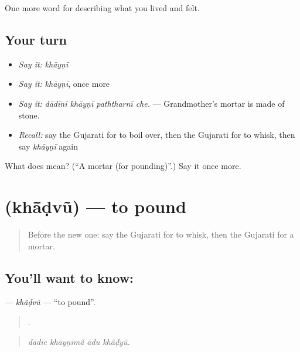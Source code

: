 \begin{grammarlens}[title={What you've built}]
One more word for describing what you lived and felt.
\end{grammarlens}

\subsection*{Your turn}
\begin{itemize}
\raggedright
  \item \emph{Say it:} \emph{khāyṇī}
  \item \emph{Say it:} \emph{khāyṇī}, once more
  \item \emph{Say it:} \emph{dādīnī khāyṇī paththarnī che.} — Grandmother's mortar is made of stone.
  \item \emph{Recall:} say the Gujarati for to boil over, then the Gujarati for to whisk, then say \emph{khāyṇī} again
\end{itemize}

\begin{tcolorbox}[breakable,colback=teal!4,colframe=teal!35!black,title={Before you move on}]
What does  mean? (\textquotedblleft{}A mortar (for pounding)\textquotedblright{}.) Say it once more.
\end{tcolorbox}
\section[\texorpdfstring{\gu{ખાંડવું} (khā̃ḍvũ)}{ખાંડવું (khā̃ḍvũ)}]{ (khā̃ḍvũ) — to pound}

\label{lesson:GU-C522-khadvu}



\begin{quote}
Before the new one: say the Gujarati for to whisk, then the Gujarati for a mortar.
\end{quote}

\subsection*{You'll want to know: }
\textbf{} — \emph{khā̃ḍvũ} — \textquotedblleft{}to pound\textquotedblright{}.

\begin{quote}
   .
\end{quote}

\begin{quote}
\emph{dādīe khāyṇīmā̃ ādu khā̃ḍyũ.}
\end{quote}

